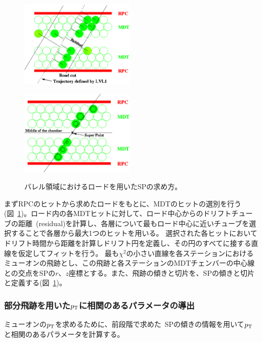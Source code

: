 \begin{figure}[h]
  \begin{minipage}[b]{0.45\linewidth}
      \centering
      \includegraphics[clip, width=5.5cm]{fig/3/mdtResidual.png}
      \label{fig:3-6-1}
  \end{minipage}
    \begin{minipage}[b]{0.5\linewidth}
      \centering
      \includegraphics[clip, width=5.5cm]{fig/3/mdtRoad.png}
      \label{fig:3-6-2}
  \end{minipage}
  \caption{バレル領域におけるロードを用いたSPの求め方\cite{article:onlineMuonReconstruction}。}
\end{figure}

まずRPCのヒットから求めたロードをもとに、MDTのヒットの選別を行う(図~\ref{fig:3-6-2})。ロード内の各MDTヒットに対して、ロード中心からのドリフトチューブの距離~(residual)を計算し、各層について最もロード中心に近いチューブを選択することで各層から最大1つのヒットを用いる。
選択された各ヒットにおいてドリフト時間から距離を計算しドリフト円を定義し、その円のすべてに接する直線を仮定してフィットを行う。
最も$\chi^2$の小さい直線を各ステーションにおけるミューオンの飛跡とし、この飛跡と各ステーションのMDTチェンバーの中心線との交点をSPの$r$、$z$座標とする。また、飛跡の傾きと切片を、SPの傾きと切片と定義する(図~\ref{fig:3-6-2})。


\subsubsection{部分飛跡を用いた$p_\mathrm{T}$に相関のあるパラメータの導出}
ミューオンの$p_\mathrm{T}$を求めるために、前段階で求めた~SPの傾きの情報を用いて$p_\mathrm{T}$と相関のあるパラメータを計算する。

